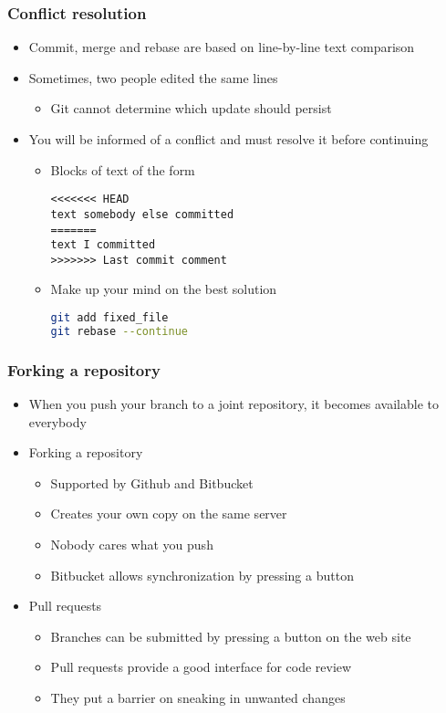\begin{frame}[fragile]
  \frametitle{Conflict resolution}
  \begin{itemize}
  \item Commit, merge and rebase are based on line-by-line text comparison
  \item Sometimes, two people edited the same lines
    \begin{itemize}
    \item Git cannot determine which update should persist
    \end{itemize}
  \item You will be informed of a conflict and must resolve it before
    continuing
    \begin{itemize}
    \item Blocks of text of the form
\begin{verbatim}
<<<<<<< HEAD
text somebody else committed
=======
text I committed
>>>>>>> Last commit comment
\end{verbatim}
    \item Make up your mind on the best solution
    \begin{block}{}
    \begin{lstlisting}[language=bash]
git add fixed_file
git rebase --continue
    \end{lstlisting}      
    \end{block}
    \end{itemize}
  \end{itemize}
\end{frame}
\begin{frame}
  \frametitle{Forking a repository}
  \begin{itemize}
  \item When you push your branch to a joint repository, it becomes
    available to everybody
  \item Forking a repository
    \begin{itemize}
    \item Supported by Github and Bitbucket
    \item Creates your own copy on the same server
    \item Nobody cares what you push
    \item Bitbucket allows synchronization by pressing a button
    \end{itemize}
  \item Pull requests
    \begin{itemize}
    \item Branches can be submitted by pressing a button on the web site
    \item Pull requests provide a good interface for code review
    \item They put a barrier on sneaking in unwanted changes
    \end{itemize}
  \end{itemize}
\end{frame}

